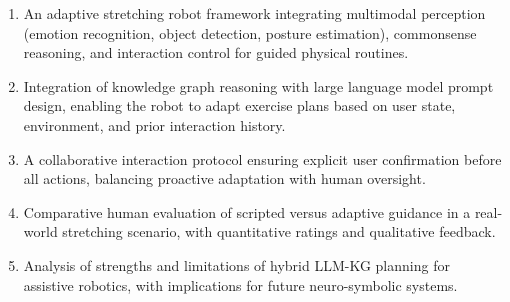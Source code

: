\begin{enumerate}
\item An adaptive stretching robot framework integrating multimodal perception (emotion recognition, object detection, posture estimation), commonsense reasoning, and interaction control for guided physical routines.

\item Integration of knowledge graph reasoning with large language model prompt design, enabling the robot to adapt exercise plans based on user state, environment, and prior interaction history.

\item A collaborative interaction protocol ensuring explicit user confirmation before all actions, balancing proactive adaptation with human oversight.

\item Comparative human evaluation of scripted versus adaptive guidance in a real-world stretching scenario, with quantitative ratings and qualitative feedback.

\item Analysis of strengths and limitations of hybrid LLM-KG planning for assistive robotics, with implications for future neuro-symbolic systems.
\end{enumerate}
